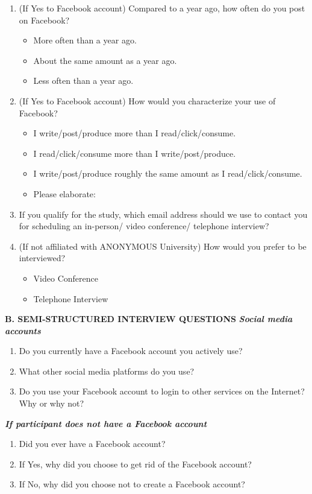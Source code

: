 \begin{appendices}
\begin{enumerate}
\item (If Yes to Facebook account) Compared to a year ago, how often do you post on Facebook?
\begin{itemize}
\item More often than a year ago.
\item About the same amount as a year ago.
\item Less often than a year ago.
\end{itemize}
\item (If Yes to Facebook account) How would you characterize your use of Facebook?
\begin{itemize}
\item I write/post/produce more than I read/click/consume.
\item I read/click/consume more than I write/post/produce.
\item I write/post/produce roughly the same amount as I read/click/consume.
\item Please elaborate:
\end{itemize}
\item If you qualify for the study, which email address should we use to contact you for scheduling an in-person/ video conference/ telephone interview?
\item (If not affiliated with ANONYMOUS University) How would you prefer to be interviewed?
\begin{itemize}
\item Video Conference
\item Telephone Interview
\end{itemize}
\end{enumerate}
\textbf{B. SEMI-STRUCTURED INTERVIEW QUESTIONS}
\textbf{\textit{Social media accounts}}
\begin{enumerate}
\item Do you currently have a Facebook account you actively use?
\item What other social media platforms do you use?
\item Do you use your Facebook account to login to other services on the Internet? Why or why not?
\end{enumerate}
\textbf{\textit{If participant does not have a Facebook account}}
\begin{enumerate}
\item Did you ever have a Facebook account?
\item If Yes, why did you choose to get rid of the Facebook account?
\item If No, why did you choose not to create a Facebook account?

\end{enumerate}
\end{appendices}
